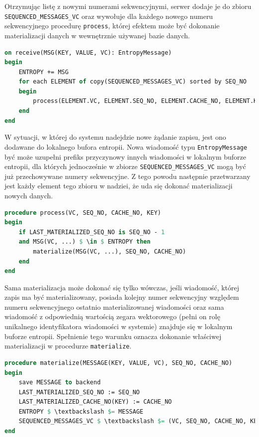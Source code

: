 Otrzymując listę z nowymi numerami sekwencyjnymi, serwer dodaje je do zbioru \texttt{SEQUENCED\_MESSAGES\_VC} oraz wywołuje dla każdego nowego numeru sekwencyjnego procedurę \texttt{process}, której efektem może być dokonanie materializacji danych w wewnętrznie używanej bazie danych.

\begin{lstlisting}[language=Pascal, caption=Pseudokod procedury obsługi wiadomości informującej o nowym zapisie w systemie, mathescape=true]
on receive(MSG(KEY, VALUE, VC): EntropyMessage)
begin
    ENTROPY += MSG
    for each ELEMENT of copy(SEQUENCED_MESSAGES_VC) sorted by SEQ_NO
    begin
        process(ELEMENT.VC, ELEMENT.SEQ_NO, ELEMENT.CACHE_NO, ELEMENT.KEY)
    end
end
\end{lstlisting}

W sytuacji, w której do systemu nadejdzie nowe żądanie zapisu, jest ono dodawane do lokalnego bufora entropii. Nowa wiadomość typu \texttt{EntropyMessage} być może uzupełni prefiks przyczynowy innych wiadomości w lokalnym buforze entropii, dla których jednocześnie w zbiorze \texttt{SEQUENCED\_MESSAGES\_VC} mogą być już przechowywane numery sekwencyjne. Z tego powodu następnie przetwarzany jest każdy element tego zbioru w nadziei, że uda się dokonać materializacji nowych danych.

\begin{lstlisting}[language=Pascal, caption=Pseudokod procedury próbującej dokonać materializacji o ile jest to możliwe, mathescape=true]
procedure process(VC, SEQ_NO, CACHE_NO, KEY)
begin
    if LAST_MATERIALIZED_SEQ_NO is SEQ_NO - 1
    and MSG(VC, ...) $ \in $ ENTROPY then
        materialize(MSG(VC, ...), SEQ_NO, CACHE_NO)
    end
end
\end{lstlisting}

Sama materializacja może dokonać się tylko wówczas, jeśli wiadomość, której zapis ma być materializowany, posiada kolejny numer sekwencyjny względem numeru sekwencyjnego ostatnio materializowanej wiadomości oraz sama wiadomość z odpowiednią wartością zegara wektorowego (pełni on rolę unikalnego identyfikatora wiadomości w systemie) znajduje się w lokalnym buforze entropii. Spełnienie tego warunku oznacza dokonanie właściwej materializacji w procedurze \texttt{materialize}.

\begin{lstlisting}[language=Pascal, caption=Pseudokod procedury materializacji wartości na danym węźle, mathescape=true]
procedure materialize(MESSAGE(KEY, VALUE, VC), SEQ_NO, CACHE_NO)
begin
    save MESSAGE to backend
    LAST_MATERIALIZED_SEQ_NO := SEQ_NO
    LAST_MATERIALIZED_CACHE_NO(KEY) := CACHE_NO
    ENTROPY $ \textbackslash $= MESSAGE
    SEQUENCED_MESSAGES_VC $ \textbackslash $= (VC, SEQ_NO, CACHE_NO, KEY)
end
\end{lstlisting}

